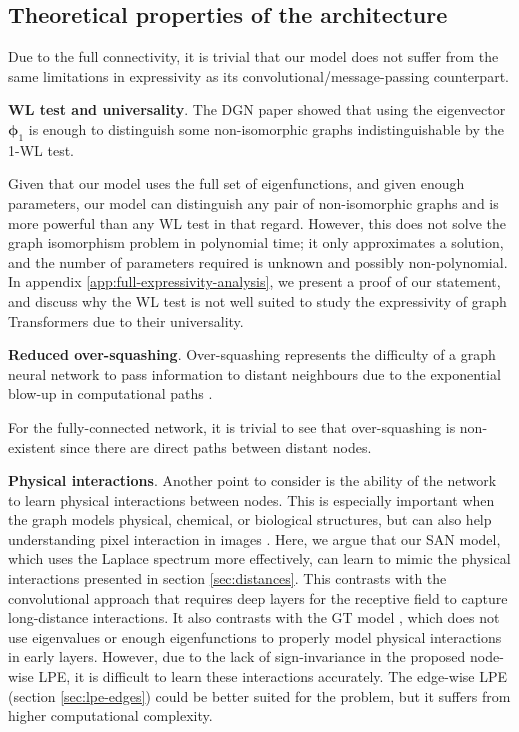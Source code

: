 \documentclass{article}
\newcommand{\xhdr}[1]{{\noindent\bfseries #1}.}
\def\eigvec{{\bm{\phi}}}
\begin{document}
\subsection{Theoretical properties of the architecture}

Due to the full connectivity, it is trivial that our model does not suffer from the same limitations in expressivity as its convolutional/message-passing counterpart. 

\xhdr{WL test and universality} The DGN paper \cite{beaini_directional_2021} showed that using the eigenvector $\eigvec_1$ is enough to distinguish some non-isomorphic graphs indistinguishable by the 1-WL test. 

Given that our model uses the full set of eigenfunctions, and given enough parameters, our model can distinguish any pair of non-isomorphic graphs and is more powerful than any WL test in that regard.
However, this does not solve the graph isomorphism problem in polynomial time; it only approximates a solution, and the number of parameters required is unknown and possibly non-polynomial.
In appendix \ref{app:full-expressivity-analysis}, we present a proof of our statement, and discuss why the WL test is not well suited to study the expressivity of graph Transformers due to their universality.

\xhdr{Reduced over-squashing} Over-squashing represents the difficulty of a graph neural network to pass information to distant neighbours due to the exponential blow-up in computational paths \cite{alon_bottleneck_2020}. 

For the fully-connected network, it is trivial to see that over-squashing is non-existent since there are direct paths between distant nodes.

\xhdr{Physical interactions} Another point to consider is the ability of the network to learn physical interactions between nodes. This is especially important when the graph models physical, chemical, or biological structures, but can also help understanding pixel interaction in images \cite{beaini_deep_2020,
beaini_improving_2020}. Here, we argue that our SAN model, which uses the Laplace spectrum more effectively, can learn to mimic the physical interactions presented in section \ref{sec:distances}.
This contrasts with the convolutional approach that requires deep layers for the receptive field to capture long-distance interactions. It also contrasts with the GT model \cite{dwivedi2020generalization}, which does not use eigenvalues or enough eigenfunctions to properly model physical interactions in early layers. 
However, due to the lack of sign-invariance in the proposed node-wise LPE, it is difficult to learn these interactions accurately. The edge-wise LPE (section \ref{sec:lpe-edges}) could be better suited for the problem, but it suffers from higher computational complexity.
\end{document}
